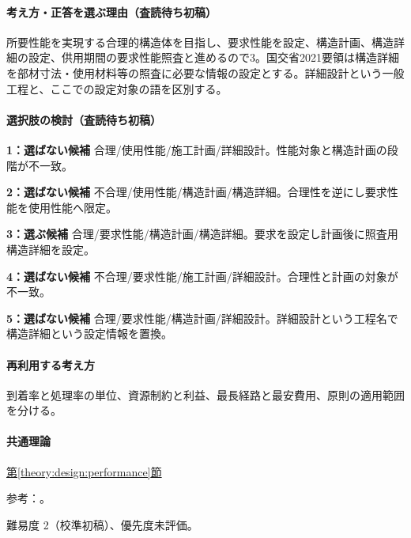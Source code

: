 \paragraph{考え方・正答を選ぶ理由（査読待ち初稿）} 所要性能を実現する合理的構造体を目指し、要求性能を設定、構造計画、構造詳細の設定、供用期間の要求性能照査と進めるので3。国交省2021要領は構造詳細を部材寸法・使用材料等の照査に必要な情報の設定とする。詳細設計という一般工程と、ここでの設定対象の語を区別する。

\paragraph{選択肢の検討（査読待ち初稿）}\mbox{}\par

\noindent\textbf{1：選ばない候補} 合理/使用性能/施工計画/詳細設計。性能対象と構造計画の段階が不一致。\par

\noindent\textbf{2：選ばない候補} 不合理/使用性能/構造計画/構造詳細。合理性を逆にし要求性能を使用性能へ限定。\par

\noindent\textbf{3：選ぶ候補} 合理/要求性能/構造計画/構造詳細。要求を設定し計画後に照査用構造詳細を設定。\par

\noindent\textbf{4：選ばない候補} 不合理/要求性能/施工計画/詳細設計。合理性と計画の対象が不一致。\par

\noindent\textbf{5：選ばない候補} 合理/要求性能/構造計画/詳細設計。詳細設計という工程名で構造詳細という設定情報を置換。\par

\paragraph{再利用する考え方} 到着率と処理率の単位、資源制約と利益、最長経路と最安費用、原則の適用範囲を分ける。

\paragraph{共通理論} \hyperref[theory:design:performance]{第\ref*{theory:design:performance}節}

\par 参考：\cite{design48_mlit}。

\par 難易度 2（校準初稿）、優先度未評価。

